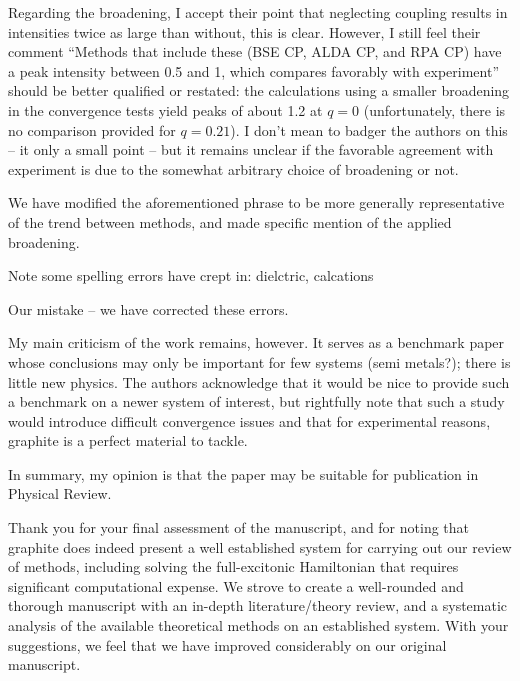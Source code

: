 \documentclass[aps,prb,10pt,endfloats]{revtex4-1}
\begin{document}
Regarding the broadening, I accept their point that neglecting coupling results
in intensities twice as large than without, this is clear. However, I still feel
their comment ``Methods that include these (BSE CP, ALDA CP, and RPA CP) have a
peak intensity between 0.5 and 1, which compares favorably with experiment''
should be better qualified or restated: the calculations using a smaller
broadening in the convergence tests yield peaks of about 1.2 at $q=0$
(unfortunately, there is no comparison provided for $q=0.21$). I don't mean to
badger the authors on this -- it only a small point -- but it remains unclear if
the favorable agreement with experiment is due to the somewhat arbitrary choice
of broadening or not.
\begin{shaded*}
We have modified the aforementioned phrase to be more generally representative
of the trend between methods, and made specific mention of the applied
broadening.
\end{shaded*}

Note some spelling errors have crept in: dielctric, calcations 
\begin{shaded*}
Our mistake -- we have corrected these errors.
\end{shaded*}

My main criticism of the work remains, however. It serves as a benchmark paper
whose conclusions may only be important for few systems (semi metals?); there is
little new physics. The authors acknowledge that it would be nice to provide
such a benchmark on a newer system of interest, but rightfully note that such a
study would introduce difficult convergence issues and that for experimental
reasons, graphite is a perfect material to tackle.

In summary, my opinion is that the paper may be suitable for publication in
Physical Review.
\begin{shaded*}
Thank you for your final assessment of the manuscript, and for noting that
graphite does indeed present a well established system for carrying out our
review of methods, including solving the full-excitonic Hamiltonian that
requires significant computational expense. We strove to create a well-rounded
and thorough manuscript with an in-depth literature/theory review, and a
systematic analysis of the available theoretical methods on an established
system. With your suggestions, we feel that we have improved considerably on our
original manuscript.
\end{shaded*}
\end{document}
